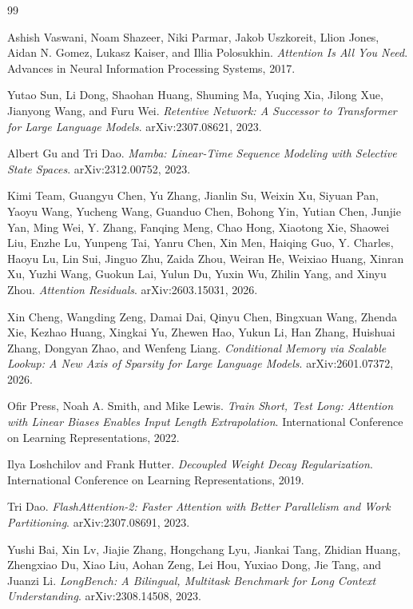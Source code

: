 \documentclass[preprint,12pt]{elsarticle}
\begin{document}
\begin{thebibliography}{99}

Ashish Vaswani, Noam Shazeer, Niki Parmar, Jakob Uszkoreit, Llion Jones, Aidan N. Gomez, Lukasz Kaiser, and Illia Polosukhin.
\textit{Attention Is All You Need}.
Advances in Neural Information Processing Systems, 2017.

Yutao Sun, Li Dong, Shaohan Huang, Shuming Ma, Yuqing Xia, Jilong Xue, Jianyong Wang, and Furu Wei.
\textit{Retentive Network: A Successor to Transformer for Large Language Models}.
arXiv:2307.08621, 2023.

Albert Gu and Tri Dao.
\textit{Mamba: Linear-Time Sequence Modeling with Selective State Spaces}.
arXiv:2312.00752, 2023.

Kimi Team, Guangyu Chen, Yu Zhang, Jianlin Su, Weixin Xu, Siyuan Pan, Yaoyu Wang, Yucheng Wang, Guanduo Chen, Bohong Yin, Yutian Chen, Junjie Yan, Ming Wei, Y. Zhang, Fanqing Meng, Chao Hong, Xiaotong Xie, Shaowei Liu, Enzhe Lu, Yunpeng Tai, Yanru Chen, Xin Men, Haiqing Guo, Y. Charles, Haoyu Lu, Lin Sui, Jinguo Zhu, Zaida Zhou, Weiran He, Weixiao Huang, Xinran Xu, Yuzhi Wang, Guokun Lai, Yulun Du, Yuxin Wu, Zhilin Yang, and Xinyu Zhou.
\textit{Attention Residuals}.
arXiv:2603.15031, 2026.

Xin Cheng, Wangding Zeng, Damai Dai, Qinyu Chen, Bingxuan Wang, Zhenda Xie, Kezhao Huang, Xingkai Yu, Zhewen Hao, Yukun Li, Han Zhang, Huishuai Zhang, Dongyan Zhao, and Wenfeng Liang.
\textit{Conditional Memory via Scalable Lookup: A New Axis of Sparsity for Large Language Models}.
arXiv:2601.07372, 2026.

Ofir Press, Noah A. Smith, and Mike Lewis.
\textit{Train Short, Test Long: Attention with Linear Biases Enables Input Length Extrapolation}.
International Conference on Learning Representations, 2022.

Ilya Loshchilov and Frank Hutter.
\textit{Decoupled Weight Decay Regularization}.
International Conference on Learning Representations, 2019.

Tri Dao.
\textit{FlashAttention-2: Faster Attention with Better Parallelism and Work Partitioning}.
arXiv:2307.08691, 2023.

Yushi Bai, Xin Lv, Jiajie Zhang, Hongchang Lyu, Jiankai Tang, Zhidian Huang, Zhengxiao Du, Xiao Liu, Aohan Zeng, Lei Hou, Yuxiao Dong, Jie Tang, and Juanzi Li.
\textit{LongBench: A Bilingual, Multitask Benchmark for Long Context Understanding}.
arXiv:2308.14508, 2023.


\end{thebibliography}
\end{document}

